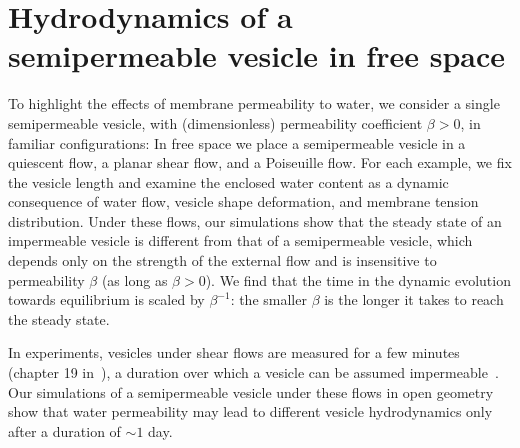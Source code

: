 \documentclass[prb,preprint,showpacs,preprintnumbers,amsmath,amssymb,longbibliography]{revtex4-1}
\begin{document}
\section{Hydrodynamics of a semipermeable vesicle in free space}
To highlight the effects of membrane permeability to water, we consider
a single semipermeable vesicle, with (dimensionless) permeability
coefficient $\beta>0$, in familiar configurations: In free space we
place a semipermeable vesicle in a quiescent flow, a planar shear flow,
and a Poiseuille flow. For each example, we fix the vesicle length and
examine the enclosed water content as a dynamic consequence of water
flow, vesicle shape deformation, and membrane tension distribution.
%
Under these flows, our simulations show
that the steady state of an impermeable vesicle is different from that of a semipermeable vesicle, which depends only on the strength of the external flow and is insensitive to permeability $\beta$ (as long as $\beta>0$). We find that  the time in the dynamic evolution towards equilibrium is scaled by $\beta^{-1}$: the smaller $\beta$ is the longer it takes to reach the steady state.

In experiments, vesicles under shear flows are measured for a few
minutes (chapter 19 in~\cite{Dimova2020_GVB}), a duration over which a
vesicle can be assumed impermeable~\cite{AbkarianViallat2005_BJ}. Our
simulations of a semipermeable vesicle under these flows in open
geometry show that water permeability may lead to different vesicle
hydrodynamics only after a duration of $\sim 1$ day. 



\end{document}
